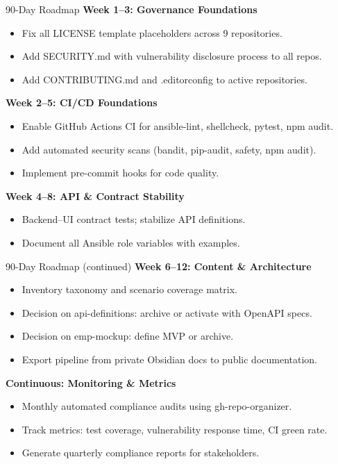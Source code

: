 \documentclass[aspectratio=169]{beamer}
\begin{document}
\begin{frame}{90-Day Roadmap \; \faRoad}
  \textbf{Week 1–3: Governance Foundations}
  \begin{itemize}
    \item Fix all LICENSE template placeholders across 9 repositories.
    \item Add SECURITY.md with vulnerability disclosure process to all repos.
    \item Add CONTRIBUTING.md and .editorconfig to active repositories.
  \end{itemize}
  
  \textbf{Week 2–5: CI/CD Foundations}
  \begin{itemize}
    \item Enable GitHub Actions CI for ansible-lint, shellcheck, pytest, npm audit.
    \item Add automated security scans (bandit, pip-audit, safety, npm audit).
    \item Implement pre-commit hooks for code quality.
  \end{itemize}
  
  \textbf{Week 4–8: API \& Contract Stability}
  \begin{itemize}
    \item Backend–UI contract tests; stabilize API definitions.
    \item Document all Ansible role variables with examples.
  \end{itemize}
\end{frame}

\begin{frame}{90-Day Roadmap (continued) \; \faRoad}
  \textbf{Week 6–12: Content \& Architecture}
  \begin{itemize}
    \item Inventory taxonomy and scenario coverage matrix.
    \item Decision on api-definitions: archive or activate with OpenAPI specs.
    \item Decision on emp-mockup: define MVP or archive.
    \item Export pipeline from private Obsidian docs to public documentation.
  \end{itemize}
  
  \textbf{Continuous: Monitoring \& Metrics}
  \begin{itemize}
    \item Monthly automated compliance audits using gh-repo-organizer.
    \item Track metrics: test coverage, vulnerability response time, CI green rate.
    \item Generate quarterly compliance reports for stakeholders.
  \end{itemize}
\end{frame}
\end{document}
